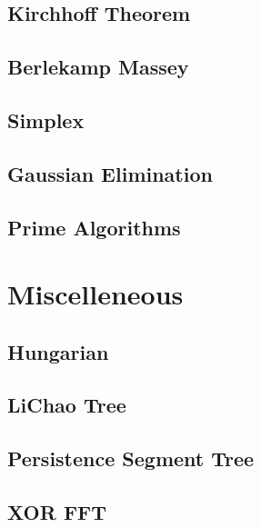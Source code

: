 \documentclass[10pt,landscape,a4paper,twocolumn]{article}
\begin{document}
\subsection{Kirchhoff Theorem}


\subsection{Berlekamp Massey}


\subsection{Simplex}


\subsection{Gaussian Elimination}


\subsection{Prime Algorithms}



\section{Miscelleneous}

\subsection{Hungarian}


\subsection{LiChao Tree}


\subsection{Persistence Segment Tree}


\subsection{XOR FFT}

\end{document}
